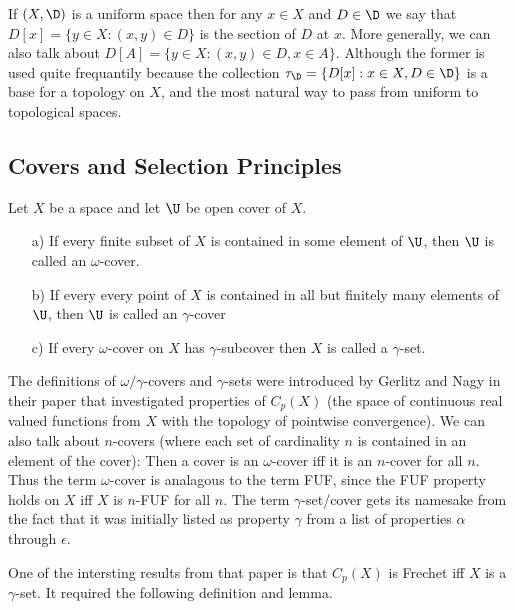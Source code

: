 \documentclass{article}
\begin{document}
    If \((X, \D)\) is a uniform space then for any \(x \in X\) and \(D \in \D\) we say that \(D[x] = \{y \in X:(x, y) \in D\}\) is the section of \(D\) at \(x\). More generally, we can also talk about \(D[A]=\{y \in X:(x, y) \in D, x \in A\}\). Although the former is used quite frequantily because the collection \(\tau_{\D} = \{D[x]:x \in X, D \in \D\}\) is a base for a topology on \(X\), and the most natural way to pass from uniform to topological spaces.
\subsection{Covers and Selection Principles}
\begin{defn} 
    Let \(X\) be a space and let \(\U\) be open cover of \(X\).
    \begin{enumerate}
        \item[a)] If every finite subset of \(X\) is contained in some element of \(\U\), then \(\U\) is called an \(\omega\)-cover.
        \item[b)] If every every point of \(X\) is contained in all but finitely many elements of \(\U\), then \(\U\) is called an \(\gamma\)-cover 
        \item[c)] If every \(\omega\)-cover on \(X\) has \(\gamma\)-subcover then \(X\) is called a \(\gamma\)-set.
    \end{enumerate}
\end{defn}
The definitions of \(\omega/\gamma\)-covers and \(\gamma\)-sets were introduced by Gerlitz and Nagy in their paper that investigated properties of \(C_p(X)\) (the space of continuous real valued functions from \(X\) with the topology of pointwise convergence). We can also talk about \(n\)-covers (where each set of cardinality \(n\) is contained in an element of the cover): Then a cover is an \(\omega\)-cover iff it is an \(n\)-cover for all \(n\). Thus the term \(\omega\)-cover is analagous to the term FUF, since the FUF property holds on \(X\) iff \(X\) is \(n\)-FUF for all \(n\). The term \(\gamma\)-set/cover gets its namesake from the fact that it was initially listed as property \(\gamma\) from a list of properties \(\alpha\) through \(\epsilon\).

One of the intersting results from that paper is that \(C_p(X)\) is Frechet iff \(X\) is a \(\gamma\)-set. It required the following definition and lemma. 
\end{document}
